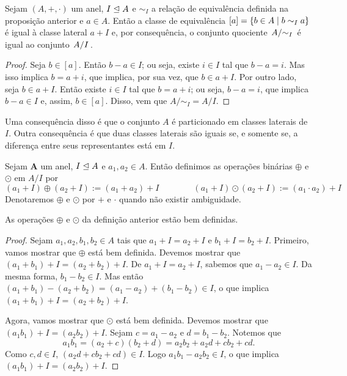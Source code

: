 \begin{proposition}
Sejam $(A,+,\cdot)$ um anel, $I \mathrel{\unlhd} A$ e $\sim_I$ a relação de equivalência definida na proposição anterior e $a \in A$. Então a classe de equivalência $[a]=\left\{{b \in A}\;\middle\vert\;{b \sim_I a}\right\}$ é igual à classe lateral $a+I$ e, por consequência, o conjunto quociente $\quo{A}{\sim_I}$ é igual ao conjunto $\quo{A}{I}$.
\end{proposition}
\begin{proof}
Seja $b \in [a]$. Então $b-a \in I$; ou seja, existe $i \in I$ tal que $b-a=i$. Mas isso implica $b=a+i$, que implica, por sua vez, que $b \in a+I$. Por outro lado, seja $b \in a+I$. Então existe $i \in I$ tal que $b=a+i$; ou seja, $b-a=i$, que implica $b-a \in I$ e, assim, $b \in [a]$. Disso, vem que $A/\sim_I = A/I$.
\end{proof}

Uma consequência disso é que o conjunto $A$ é particionado em classes laterais de $I$. Outra consequência é que duas classes laterais são iguais se, e somente se, a diferença entre seus representantes está em $I$.

\begin{definition}
Sejam $\bm A$ um anel, $I \mathrel{\unlhd} A$ e $a_1,a_2 \in A$. Então definimos as operações binárias $\oplus$ e $\odot$ em $A/I$ por
	\begin{equation*}
	(a_1+I) \oplus (a_2+I) := (a_1+a_2)+I \qquad \qquad (a_1+I) \odot (a_2+I) := (a_1 \cdot a_2)+I
	\end{equation*}
Denotaremos $\oplus$ e $\odot$ por $+$ e $\cdot$ quando não existir ambiguidade.
\end{definition}

\begin{proposition}
As operações $\oplus$ e $\odot$ da definição anterior estão bem definidas.
\end{proposition}
\begin{proof}
	Sejam $a_1,a_2,b_1,b_2 \in A$ tais que $a_1+I=a_2+I$ e $b_1+I=b_2+I$. Primeiro, vamos mostrar que $\oplus$ está bem definida. Devemos mostrar que $(a_1+b_1)+I=(a_2+b_2)+I$. De $a_1+I=a_2+I$, sabemos que $a_1-a_2 \in I$. Da mesma forma, $b_1-b_2 \in I$. Mas então $(a_1+b_1)-(a_2+b_2) = (a_1-a_2)+(b_1-b_2) \in I$, o que implica $(a_1+b_1)+I=(a_2+b_2)+I$.

	Agora, vamos mostrar que $\odot$ está bem definida. Devemos mostrar que $(a_1b_1)+I=(a_2b_2)+I$. Sejam $c=a_1-a_2$ e $d=b_1-b_2$. Notemos que
	\begin{equation*}
	a_1b_1 = (a_2+c)(b_2+d) = a_2b_2 + a_2d + cb_2 + cd.
	\end{equation*}
Como $c,d \in I$, $(a_2d + cb_2 + cd) \in I$. Logo $a_1b_1-a_2b_2 \in I$, o que implica $(a_1b_1)+I=(a_2b_2)+I$.
\end{proof}


